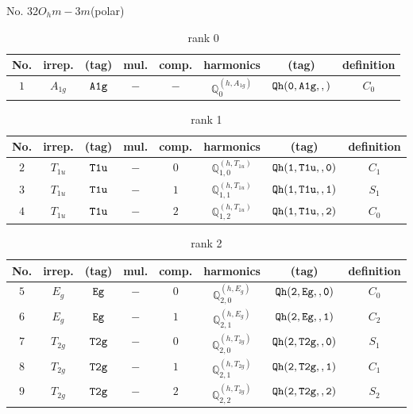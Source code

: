 \documentclass[fleqn,8pt]{jsarticle}
\begin{document}
\setcounter{MaxMatrixCols}{16}

\begin{center}
\LARGE
No. 32\quad$O_{h}$\quad$m-3m$\quad[ cubic ] (polar)
\end{center}
\begin{table}[ht!]
\begin{center}
\caption{rank 0}
\renewcommand{\arraystretch}{1.3}
\begin{tabular}{cccccccc} \hline \hline
No. & irrep. & (tag) & mul. & comp. & harmonics & (tag) & definition \\ \hline
$ 1 $ & $ A_{1g} $ & $ {\tt A1g} $ & $ - $ & $ - $ & $ \mathbb{Q}_{0}^{(h,A_{1g})} $ & $ {\tt Qh(0,A1g,,)} $ & $ C_{0} $ \\
 \hline \hline
\end{tabular}
\end{center}
\end{table}
\begin{table}[ht!]
\begin{center}
\caption{rank 1}
\renewcommand{\arraystretch}{1.3}
\begin{tabular}{cccccccc} \hline \hline
No. & irrep. & (tag) & mul. & comp. & harmonics & (tag) & definition \\ \hline
$ 2 $ & $ T_{1u} $ & $ {\tt T1u} $ & $ - $ & $ 0 $ & $ \mathbb{Q}_{1,0}^{(h,T_{1u})} $ & $ {\tt Qh(1,T1u,,0)} $ & $ C_{1} $ \\
$ 3 $ & $ T_{1u} $ & $ {\tt T1u} $ & $ - $ & $ 1 $ & $ \mathbb{Q}_{1,1}^{(h,T_{1u})} $ & $ {\tt Qh(1,T1u,,1)} $ & $ S_{1} $ \\
$ 4 $ & $ T_{1u} $ & $ {\tt T1u} $ & $ - $ & $ 2 $ & $ \mathbb{Q}_{1,2}^{(h,T_{1u})} $ & $ {\tt Qh(1,T1u,,2)} $ & $ C_{0} $ \\
 \hline \hline
\end{tabular}
\end{center}
\end{table}
\begin{table}[ht!]
\begin{center}
\caption{rank 2}
\renewcommand{\arraystretch}{1.3}
\begin{tabular}{cccccccc} \hline \hline
No. & irrep. & (tag) & mul. & comp. & harmonics & (tag) & definition \\ \hline
$ 5 $ & $ E_{g} $ & $ {\tt Eg} $ & $ - $ & $ 0 $ & $ \mathbb{Q}_{2,0}^{(h,E_{g})} $ & $ {\tt Qh(2,Eg,,0)} $ & $ C_{0} $ \\
$ 6 $ & $ E_{g} $ & $ {\tt Eg} $ & $ - $ & $ 1 $ & $ \mathbb{Q}_{2,1}^{(h,E_{g})} $ & $ {\tt Qh(2,Eg,,1)} $ & $ C_{2} $ \\
$ 7 $ & $ T_{2g} $ & $ {\tt T2g} $ & $ - $ & $ 0 $ & $ \mathbb{Q}_{2,0}^{(h,T_{2g})} $ & $ {\tt Qh(2,T2g,,0)} $ & $ S_{1} $ \\
$ 8 $ & $ T_{2g} $ & $ {\tt T2g} $ & $ - $ & $ 1 $ & $ \mathbb{Q}_{2,1}^{(h,T_{2g})} $ & $ {\tt Qh(2,T2g,,1)} $ & $ C_{1} $ \\
$ 9 $ & $ T_{2g} $ & $ {\tt T2g} $ & $ - $ & $ 2 $ & $ \mathbb{Q}_{2,2}^{(h,T_{2g})} $ & $ {\tt Qh(2,T2g,,2)} $ & $ S_{2} $ \\
 \hline \hline
\end{tabular}
\end{center}
\end{table}
\end{document}
